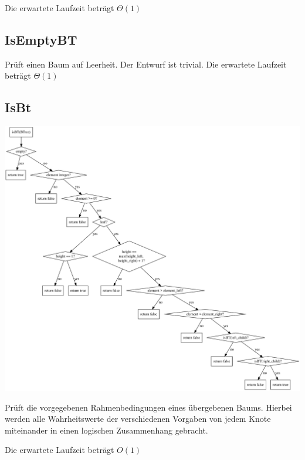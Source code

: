 \documentclass[11pt]{article}
\begin{document}
    Die erwartete Laufzeit beträgt \begin{math}
                                       \Theta(1)
    \end{math}

    \subsection{IsEmptyBT}
    Prüft einen Baum auf Leerheit.
    Der Entwurf ist trivial.
    Die erwartete Laufzeit beträgt \begin{math}
                                       \Theta(1)
    \end{math}

    \subsection{IsBt}

    \begin{center}
        \includegraphics[width=1.2\columnwidth] {isBt}
    \end{center}

    Prüft die vorgegebenen Rahmenbedingungen eines übergebenen Baums.
    Hierbei werden alle Wahrheitswerte der verschiedenen
    Vorgaben von jedem Knote miteinander in einen logischen
    Zusammenhang gebracht.

    Die erwartete Laufzeit beträgt \begin{math}
                                       O(1)
    \end{math}
\end{document}
